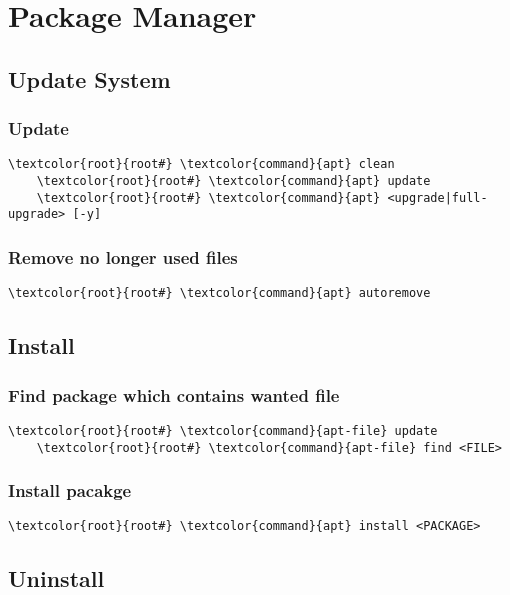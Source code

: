 \documentclass[10pt, a4paper, onecolumn, openany]{book} %
\begin{document}
\chapter{Package Manager}
\section{Update System}
\subsection{Update}
\begin{Verbatim}[commandchars=\\\{\}]
    \textcolor{root}{root#} \textcolor{command}{apt} clean
    \textcolor{root}{root#} \textcolor{command}{apt} update
    \textcolor{root}{root#} \textcolor{command}{apt} <upgrade|full-upgrade> [-y]
\end{Verbatim}
\subsection{Remove no longer used files}
\begin{Verbatim}[commandchars=\\\{\}]
    \textcolor{root}{root#} \textcolor{command}{apt} autoremove
\end{Verbatim}

\section{Install}
\subsection{Find package which contains wanted file}
\begin{Verbatim}[commandchars=\\\{\}]
    \textcolor{root}{root#} \textcolor{command}{apt-file} update
    \textcolor{root}{root#} \textcolor{command}{apt-file} find <FILE>
\end{Verbatim}
\subsection{Install pacakge}
\begin{Verbatim}[commandchars=\\\{\}]
    \textcolor{root}{root#} \textcolor{command}{apt} install <PACKAGE>
\end{Verbatim}

\section{Uninstall}
\end{document}
